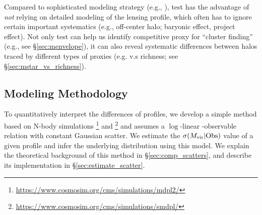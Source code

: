 \documentclass[fleqn,usenatbib,useAMS,english]{mnras}
\begin{document}
    Compared to sophisticated modeling strategy (e.g., \citealt{Sonnenfeld2019}), \topn{} test
    has the advantage of \emph{not} relying on detailed modeling of the lensing profile, which
    often has to ignore certain important systematics (e.g., off-center halo; baryonic effect,
    project effect).
    Not only \topn{} test can help us identify competitive \mvir{} proxy for ``cluster finding''
    (e.g., see \S \ref{sec:menvelope}), it can also reveal systematic differences between halos
    traced by different types of proxies (e.g. \mstar{} v.s richness;
    see \S \ref{sec:mstar_vs_richness}).

\subsection{Modeling Methodology}
    \label{sec:model}

    To quantitatively interpret the differences of \dsigma{} profiles, we develop a simple
    method based on N-body simulations
    \footnote{\url{https://www.cosmosim.org/cms/simulations/mdpl2/}}
    and \smdpl{}\footnote{\url{https://www.cosmosim.org/cms/simulations/smdpl/}} and assumes a
    $\log$-linear \mvir{}-observable relation with constant Gaussian scatter.
    We estimate the $\sigma(M_{\rm vir} | {\rm Obs})$ value of a given \dsigma{} profile and
    infer the underlying \mvir{} distribution using this model.
    We explain the theoretical background of this method in \S \ref{sec:comp_scatters}, and
    describe its implementation in \S \ref{sec:estimate_scatter}.
\end{document}
